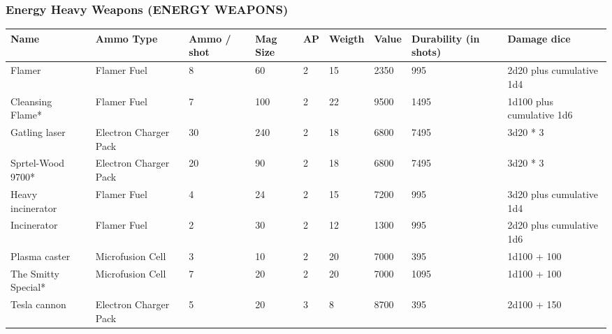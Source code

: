 
\subsubsection{Energy Heavy Weapons (ENERGY WEAPONS)}
\begin{longtable}{|p{3.2cm}|p{2.4cm}|p{1.3cm}|p{.9cm}|p{0.6cm}|p{1.3cm}|p{1cm}|p{2cm}|p{3.2cm}|}
\hline
\bfseries Name & \bfseries Ammo Type & \bfseries Ammo / shot & \bfseries Mag Size & \bfseries AP & \bfseries Weigth & \bfseries Value & \bfseries Durability (in shots) & \bfseries Damage dice \\
\hline
\endhead
Flamer & Flamer Fuel & 8 & 60 & 2 & 15 & 2350 & 995 & 2d20 plus cumulative 1d4 \\
Cleansing Flame* & Flamer Fuel & 7 & 100 & 2 & 22 & 9500 & 1495 & 1d100 plus cumulative 1d6 \\
Gatling laser & Electron Charger Pack & 30 & 240 & 2 & 18 & 6800 & 7495 & 3d20 * 3 \\
Sprtel-Wood 9700* & Electron Charger Pack & 20 & 90 & 2 & 18 & 6800 & 7495 & 3d20 * 3 \\
Heavy incinerator & Flamer Fuel & 4 & 24 & 2 & 15 & 7200 & 995 & 3d20 plus cumulative 1d4 \\
Incinerator & Flamer Fuel & 2 & 30 & 2 & 12 & 1300 & 995 & 2d20 plus cumulative 1d6 \\
Plasma caster & Microfusion Cell & 3 & 10 & 2 & 20 & 7000 & 395 & 1d100 + 100 \\
The Smitty Special* & Microfusion Cell & 7 & 20 & 2 & 20 & 7000 & 1095 & 1d100 + 100 \\
Tesla cannon & Electron Charger Pack & 5 & 20 & 3 & 8 & 8700 & 395 & 2d100 + 150 \\
\hline
\end{longtable}
